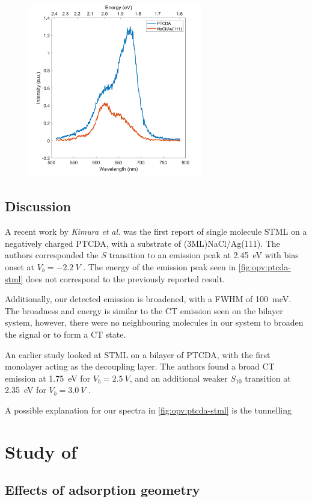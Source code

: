 \begin{figure} [h]
    \centering
    \includegraphics[width=3in]{pictures/stml_ptcda_au111.png}
    \caption{}
    \label{fig:opv:ptcda-stml}
\end{figure}





\subsection{Discussion}

A recent work by \emph{Kimura et al.} was the first report of single molecule \ac{STML} on a negatively charged PTCDA, with a substrate of (3ML)NaCl/Ag(111). The authors corresponded the $S$  transition to an emission peak at \SI{2.45}{eV} with bias onset at $V_b=\SI{-2.2}{V}$ \citep{Kimura2019}. The energy of the emission peak seen in \autoref{fig:opv:ptcda-stml} does not correspond to the previously reported result. 

Additionally, our detected emission is broadened, with a \ac{FWHM} of \SI{100}{meV}. The broadness and energy is similar to the \ac{CT} emission seen on the bilayer system, however, there were no neighbouring molecules in our system to broaden the signal or to form a \ac{CT} state. 

An earlier study looked at \ac{STML} on a bilayer of \ac{PTCDA}, with the first monolayer acting as the decoupling layer. The authors found a broad \ac{CT} emission at \SI{1.75}{eV} for $V_b =\SI{2.5}{V}$, and an additional weaker $S_{10}$ transition at \SI{2.35}{eV} for $V_b = \SI{3.0}{V}$ \citep{Rzeznicka2011}. 

A possible explanation for our spectra in \autoref{fig:opv:ptcda-stml} is the tunnelling






\section{Study of }






\subsection{Effects of adsorption geometry}





